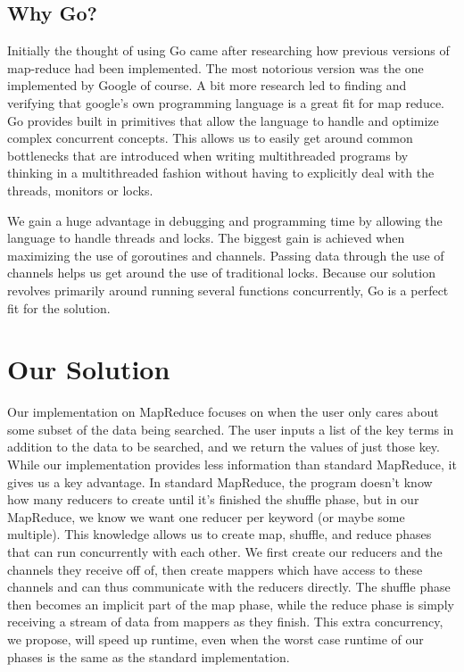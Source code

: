 \documentclass[report]{IEEEtran}
\begin{document}
\subsection {Why Go?}
Initially the thought of using Go came after researching how previous versions of map-reduce had been implemented. The most notorious version was the one implemented by Google of course. A bit more research led to finding and verifying that google's own programming language is a great fit for map reduce. Go provides built in primitives that allow the language to handle and optimize complex concurrent concepts. This allows us to easily get around common bottlenecks that are introduced when writing multithreaded programs by thinking in a multithreaded fashion without having to explicitly deal with the threads, monitors or locks.

We gain a huge advantage in debugging and programming time by allowing the language to handle threads and locks. The biggest gain is achieved when maximizing the use of goroutines and channels. Passing data through the use of channels helps us get around the use of traditional locks. Because our solution revolves primarily around running several functions concurrently, Go is a perfect fit for the solution. 

\section{Our Solution}

Our implementation on MapReduce focuses on when the user only cares about some subset of the data being searched. The user inputs a list of the key terms in addition to the data to be searched, and we return the values of just those key. While our implementation provides less information than standard MapReduce, it gives us a key advantage. In standard MapReduce, the program doesn't know how many reducers to create until it's finished the shuffle phase, but in our MapReduce, we know we want one reducer per keyword (or maybe some multiple). This knowledge allows us to create map, shuffle, and reduce phases that can run concurrently with each other. We first create our reducers and the channels they receive off of, then create mappers which have access to these channels and can thus communicate with the reducers directly. The shuffle phase then becomes an implicit part of the map phase, while the reduce phase is simply receiving a stream of data from mappers as they finish. This extra concurrency, we propose, will speed up runtime, even when the worst case runtime of our phases is the same as the standard implementation. 
\end{document}
